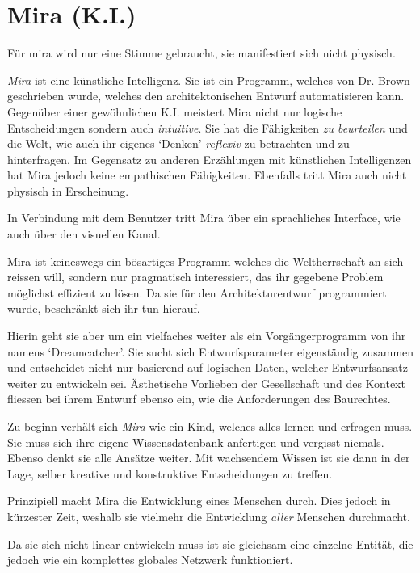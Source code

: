 \documentclass[11pt,a4paper,ngerman]{scrreprt}
\begin{document}
\section*{Mira (K.I.)}

Für mira wird nur eine Stimme gebraucht, sie manifestiert sich nicht
physisch.

\emph{Mira} ist eine künstliche Intelligenz. Sie ist ein Programm, welches von
Dr. Brown geschrieben wurde, welches den architektonischen Entwurf
automatisieren kann. Gegenüber einer gewöhnlichen K.I. meistert Mira nicht
nur logische Entscheidungen sondern auch \emph{intuitive}. Sie hat die Fähigkeiten
\emph{zu beurteilen} und die Welt, wie auch ihr eigenes `Denken' \emph{reflexiv} zu
betrachten und zu hinterfragen. Im Gegensatz zu anderen Erzählungen mit
künstlichen Intelligenzen hat Mira jedoch keine empathischen
Fähigkeiten. Ebenfalls tritt Mira auch nicht physisch in Erscheinung.

In Verbindung mit dem Benutzer tritt Mira über ein sprachliches Interface,
wie auch über den visuellen Kanal.

Mira ist keineswegs ein bösartiges Programm welches die Weltherrschaft an
sich reissen will, sondern nur pragmatisch interessiert, das ihr gegebene
Problem möglichst effizient zu lösen. Da sie für den Architekturentwurf
programmiert wurde, beschränkt sich ihr tun hierauf.

Hierin geht sie aber um ein vielfaches weiter als ein Vorgängerprogramm von
ihr namens `Dreamcatcher'. Sie sucht sich Entwurfsparameter eigenständig
zusammen und entscheidet nicht nur basierend auf logischen Daten, welcher
Entwurfsansatz weiter zu entwickeln sei. Ästhetische Vorlieben der
Gesellschaft und des Kontext fliessen bei ihrem Entwurf ebenso ein, wie die
Anforderungen des Baurechtes.

Zu beginn verhält sich \emph{Mira} wie ein Kind, welches alles lernen und erfragen
muss. Sie muss sich ihre eigene Wissensdatenbank anfertigen und vergisst
niemals. Ebenso denkt sie alle Ansätze weiter. Mit wachsendem Wissen ist sie
dann in der Lage, selber kreative und konstruktive Entscheidungen zu treffen.

Prinzipiell macht Mira die Entwicklung eines Menschen durch. Dies jedoch in
kürzester Zeit, weshalb sie vielmehr die Entwicklung \emph{aller} Menschen
durchmacht.

Da sie sich nicht linear entwickeln muss ist sie gleichsam eine einzelne
Entität, die jedoch wie ein komplettes globales Netzwerk funktioniert.
\end{document}
